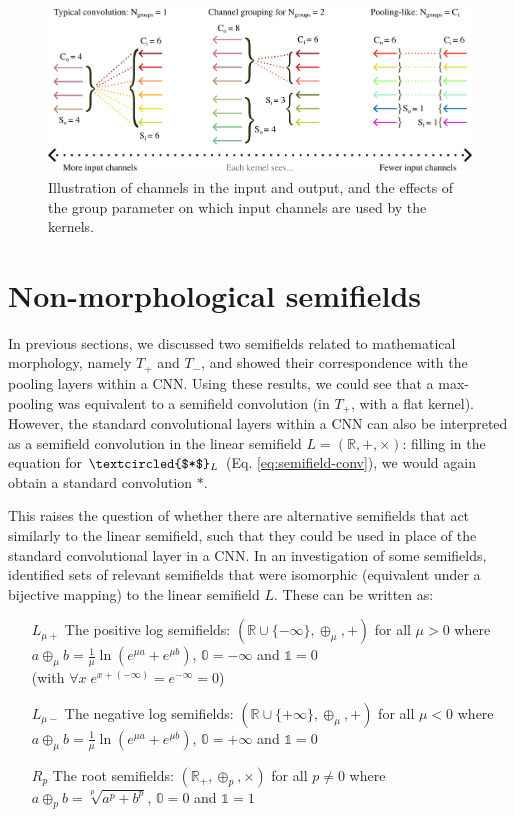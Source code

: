 \documentclass[a4paper, 12pt]{report}
\begin{document}
\begin{figure}[h!]
	\center
  \includegraphics[width=\textwidth]{figures/channels-groups.png}
  \caption{Illustration of channels in the input and output, and the effects of the group parameter on which input channels are used by the kernels.}
  \label{fig:channels-groups}
\end{figure}

\section{Non-morphological semifields}
In previous sections, we discussed two semifields related to mathematical morphology, namely $T_+$ and $T_-$, and showed their correspondence with the pooling layers within a CNN. Using these results, we could see that a max-pooling was equivalent to a semifield convolution (in $T_+$, with a flat kernel). However, the standard convolutional layers within a CNN can also be interpreted as a semifield convolution in the linear semifield
$L=(\mathbb{R}, +, \times)$: filling in the equation for $\textcircled{$*$}_L$ (Eq. \ref{eq:semifield-conv}), we would again obtain a standard convolution $*$.

This raises the question of whether there are alternative semifields that act similarly to the linear semifield, such that they could be used in place of the standard convolutional layer in a CNN. In an investigation of some semifields, \cite{bellaardaxiomatic} identified sets of relevant semifields that were isomorphic (equivalent under a bijective mapping) to the linear semifield $L$. These can be written as:

\begin{itemize}
	\item[$L_{\mu+}$]  The positive log semifields:  $(\mathbb{R}\cup \{-\infty\}, \oplus_\mu, +)$ for all $\mu>0$ where \\$a\oplus_\mu b= \frac{1}{\mu}\ln(e^{\mu a}+e^{\mu b})$, $\mathbb{0}=-\infty$ and $\mathbb{1}=0$ 
	\\(with $\forall x\;e^{x+(-\infty)}=e^{-\infty}=0$)
	\item[$L_{\mu-}$]  The negative log semifields:  $(\mathbb{R}\cup \{+\infty\}, \oplus_\mu, +)$ for all $\mu<0$ where \\$a\oplus_\mu b= \frac{1}{\mu}\ln(e^{\mu a}+e^{\mu b})$, $\mathbb{0}=+\infty$ and $\mathbb{1}=0$ 
	\item[$R_p$]  The root semifields:  $(\mathbb{R}_+, \oplus_p, \times)$ for all $p\ne0$ where \\$a\oplus_p b= \sqrt[p]{a^p+b^p}$, $\mathbb{0}=0$ and $\mathbb{1}=1$
\end{itemize}
\end{document}

